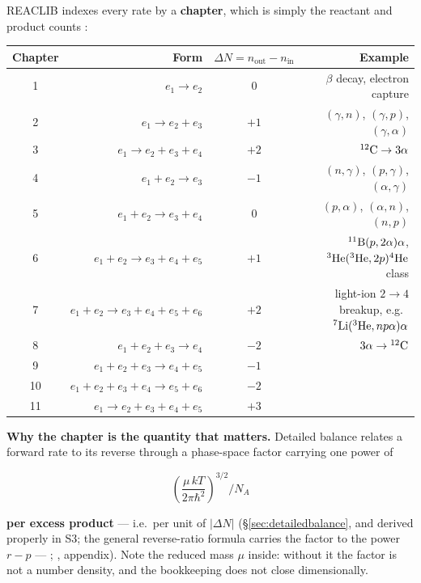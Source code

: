 REACLIB indexes every rate by a \textbf{chapter}, which is simply the reactant
and product counts \citep[][all eleven forms below verified against the JINA
REACLIB format definition]{cyburt2010}:

\begin{center}
\small
\begin{tabularx}{\textwidth}{@{}c R{0.95} c R{1.05}@{}}
\toprule
\textbf{Chapter} & \textbf{Form} &
\textbf{$\Delta N = n_{\text{out}} - n_{\text{in}}$} & \textbf{Example} \\
  & $e_1 \to e_2$ & 0 & $\beta$ decay, electron capture \\
2  & $e_1 \to e_2 + e_3$ & $+1$ &
     $(\gamma,n)$, $(\gamma,p)$, $(\gamma,\alpha)$ \\
3  & $e_1 \to e_2 + e_3 + e_4$ & $+2$ & $\nuc{C}{12} \to 3\alpha$ \\
4  & $e_1 + e_2 \to e_3$ & $-1$ &
     $(n,\gamma)$, $(p,\gamma)$, $(\alpha,\gamma)$ \\
5  & $e_1 + e_2 \to e_3 + e_4$ & 0 &
     $(p,\alpha)$, $(\alpha,n)$, $(n,p)$ \\
6  & $e_1 + e_2 \to e_3 + e_4 + e_5$ & $+1$ &
     $\nuc{B}{11}(p,2\alpha)\alpha$, $\nuc{He}{3}(\nuc{He}{3},2p)\nuc{He}{4}$
     class \\
7  & $e_1 + e_2 \to e_3 + e_4 + e_5 + e_6$ & $+2$ &
     light-ion $2\to4$ breakup, e.g.\
     $\nuc{Li}{7}(\nuc{He}{3},n p \alpha)\alpha$ \\
8  & $e_1 + e_2 + e_3 \to e_4$ & $-2$ &
     \textbf{$3\alpha \to \nuc{C}{12}$} \\
9  & $e_1 + e_2 + e_3 \to e_4 + e_5$ & $-1$ & \\
10 & $e_1 + e_2 + e_3 + e_4 \to e_5 + e_6$ & $-2$ & \\
11 & $e_1 \to e_2 + e_3 + e_4 + e_5$ & $+3$ & \\
\bottomrule
\end{tabularx}
\end{center}

\textbf{Why the chapter is the quantity that matters.} Detailed balance relates
a forward rate to its reverse through a phase-space factor carrying one power of

\begin{equation*}
\left(\frac{\mu\,kT}{2\pi\hbar^2}\right)^{3/2}\Big/ N_A
\end{equation*}

\textbf{per excess product} --- i.e.\ per unit of $|\Delta N|$
(\S\ref{sec:detailedbalance}, and derived properly in S3; the general
reverse-ratio formula carries the factor to the power $r - p$ ---
\citealt{rauscher2000}; \citealt{smith2023}, appendix). Note the reduced mass
$\mu$ inside: without it the factor is not a number density, and the
bookkeeping does not close dimensionally.

